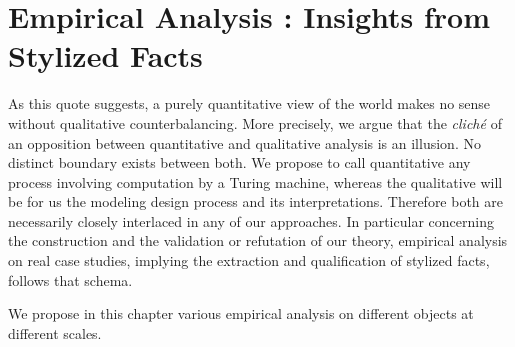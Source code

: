 


\chapter{Empirical Analysis : Insights from Stylized Facts} %

\label{ch:empirical} %


















As this quote suggests, a purely quantitative view of the world makes no sense without qualitative counterbalancing. More precisely, we argue that the \textit{clich{\'e}} of an opposition between quantitative and qualitative analysis is an illusion. No distinct boundary exists between both. We propose to call quantitative any process involving computation by a Turing machine, whereas the qualitative will be for us the modeling design process and its interpretations. Therefore both are necessarily closely interlaced in any of our approaches. In particular concerning the construction and the validation or refutation of our theory, empirical analysis on real case studies, implying the extraction and qualification of stylized facts, follows that schema.


We propose in this chapter various empirical analysis on different objects at different scales.




